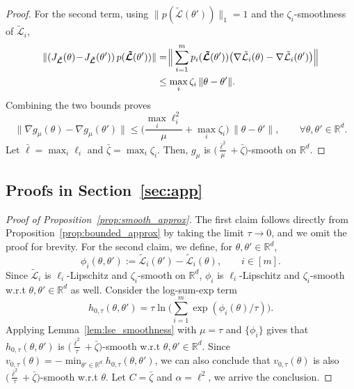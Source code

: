 \documentclass[sigconf]{acmart}
\begin{document}
\begin{proof}
For the second term, using $\|p(\boldsymbol{\tilde{\mathcal{L}}}(\theta'))\|_1=1$ and the $\zeta_i$-smoothness of $\tilde{\mathcal{L}}_i$,
\begin{align}
\|(J_{\boldsymbol{\tilde{\mathcal{L}}}}(\theta)\!-\!J_{\boldsymbol{\tilde{\mathcal{L}}}}(\theta'))\,p(\boldsymbol{\tilde{\mathcal{L}}}(\theta'))\|&=\!
\Big\|\sum_{i=1}^m p_i(\boldsymbol{\tilde{\mathcal{L}}}(\theta'))\big(\nabla \tilde{\mathcal{L}}_i(\theta)-\nabla \tilde{\mathcal{L}}_i(\theta')\big)\Big\| \notag\\
&\le \max_i \zeta_i \,\|\theta-\theta'\|\notag.
\end{align}
Combining the two bounds proves
\[
\|\nabla g_\mu(\theta)-\nabla g_\mu(\theta')\|
\le
\Big(\frac{\max_i \ell_i^2}{\mu}+\max_i \zeta_i\Big)\,\|\theta-\theta'\|,
\qquad \forall \theta,\theta'\in \mathbb{R}^d.
\]
Let $\bar{\ell}=\max_{i}\ell_i$ and $\bar{\zeta}=\max_{i}\zeta_i$. Then, $g_{\mu}$ is $\Big(\frac{\bar{\ell}^2}{\mu}+\bar{\zeta}\Big)$-smooth on $\mathbb{R}^d$.
\end{proof}

\subsection{Proofs in Section~\ref{sec:app}}
\begin{proof}[Proof of Proposition~\ref{prop:smooth_approx}]
The first claim follows directly from Proposition~\ref{prop:bounded_approx} by taking the limit $\tau \rightarrow 0$, and we omit the proof for brevity. For the second claim, we define, for $\theta, \theta'\in \mathbb{R}^d$,
\[
\phi_i(\theta, \theta'):=\tilde{\mathcal{L}}_i(\theta')-\tilde{\mathcal{L}}_i(\theta),\qquad i\in[m].
\]
Since $\tilde{\mathcal{L}}_i$ is $\ell_i$-Lipschitz and $\zeta_i$-smooth on $\mathbb{R}^d$, $\phi_i$ is $\ell_i$-Lipschitz and $\zeta_i$-smooth w.r.t $\theta, \theta'\in \mathbb{R}^d$ as well.
Consider the log-sum-exp term
\[
h_{0,\tau}(\theta,\theta')=\tau\ln\!\Big(\sum_{i=1}^{m}\exp(\phi_i(\theta)/\tau)\Big).
\]
Applying Lemma~\ref{lem:lse_smoothness} with $\mu=\tau$ and $\{\phi_i\}$ gives that $h_{0,\tau}(\theta,\theta')$ is $\big(\frac{\bar{\ell}^2}{\tau}+\bar{\zeta}\big)$-smooth w.r.t $\theta, \theta'\in \mathbb{R}^d$. Since  $v_{0, \tau}(\theta) =-\min_{\theta' \in \mathbb{R}^d} h_{0,\tau}(\theta,\theta')$, we can also conclude that  $v_{0, \tau}(\theta)$ is also $\big(\frac{\bar{\ell}^2}{\tau}+\bar{\zeta}\big)$-smooth w.r.t $\theta$. Let $C=\bar{\zeta}$ and $\alpha = {\ell}^2$, we arrive the conclusion.
\end{proof}
\end{document}
